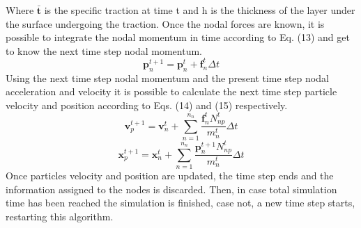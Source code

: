 \documentclass[preprint,12pt]{elsarticle}
\begin{document}
Where $\boldsymbol{\bar{t}}$ is the specific traction at time t and h is the thickness of the layer under the surface undergoing the traction.
Once the nodal forces are known, it is possible to integrate the nodal momentum in time according to Eq. (13) and get to know the next time step nodal momentum.
\begin{equation}
\boldsymbol{p}_n^{t+1}=\boldsymbol{p}_n^{t}+\boldsymbol{f}_n^{t}\Delta t
\end{equation}
Using the next time step nodal momentum and the present time step nodal acceleration and velocity it is possible to calculate the next time step particle velocity and position according to Eqs. (14) and (15) respectively.
\begin{equation}
    \boldsymbol{v}_p^{t+1}=\boldsymbol{v}_n^{t}+\sum_{n=1}^{n_n}\frac{\boldsymbol{f}_n^{t}N_{np}^{t}}{m_n^t}\Delta t
\end{equation}
\begin{equation}
    \boldsymbol{x}_p^{t+1}=\boldsymbol{x}_n^{t}+\sum_{n=1}^{n_n}\frac{\boldsymbol{p}_n^{t+1}N_{np}^{t}}{m_n^t}\Delta t
\end{equation}
Once particles velocity and position are updated, the time step ends and the information assigned to the nodes is discarded. Then, in case total simulation time has been reached the simulation is finished, case not, a new time step starts, restarting this algorithm.
\end{document}
